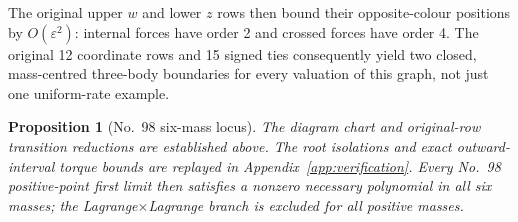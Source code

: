 \documentclass[11pt]{amsart}
\newtheorem{proposition}[theorem]{Proposition}
\theoremstyle{remark}
\begin{document}
The original upper $w$ and lower $z$ rows then bound their opposite-colour positions by $O(\varepsilon^2)$: internal forces have order 2 and crossed forces have order 4. The original 12 coordinate rows and 15 signed ties consequently yield two closed, mass-centred three-body boundaries for every valuation of this graph, not just one uniform-rate example.
\begin{proposition}[No.~98 six-mass locus]\label{prop:no98-locus}
The diagram chart and original-row transition reductions are established above. The root isolations and exact outward-interval torque bounds are replayed in Appendix~\ref{app:verification}. Every No.~98 positive-point first limit then satisfies a nonzero necessary polynomial in all six masses; the Lagrange$\times$Lagrange branch is excluded for all positive masses.
\end{proposition}
\end{document}
